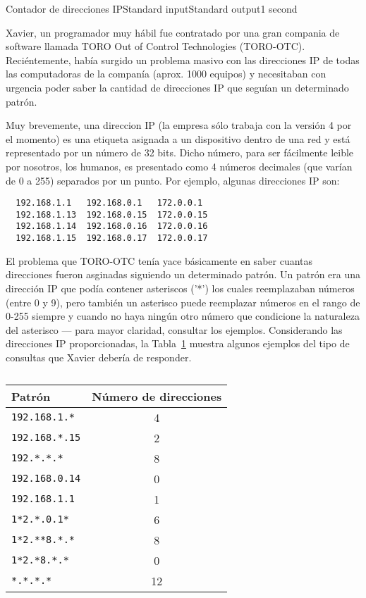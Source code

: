 \begin{problem}{Contador de direcciones IP}{Standard input}{Standard output}{1 second}{}


Xavier, un programador muy h\'abil fue contratado por una gran compania de software llamada TORO Out of Control Technologies (TORO-OTC). Reci\'entemente, hab\'ia surgido un problema masivo con las direcciones IP de todas las computadoras de la compan\'ia (aprox. 1000 equipos) y necesitaban con urgencia poder saber la cantidad de direcciones IP que segu\'ian un determinado patr\'on.

Muy brevemente, una direccion IP (la empresa s\'olo trabaja con la versi\'on 4 por el momento)  es una etiqueta asignada a un dispositivo dentro de una red y est\'a representado por un n\'umero de 32 bits. Dicho n\'umero, para ser f\'acilmente leible por nosotros, los humanos, es presentado como 4 n\'umeros decimales (que var\'ian de 0 a 255) separados por un punto. Por ejemplo, algunas direcciones IP son:

\begin{verbatim}
  192.168.1.1   192.168.0.1   172.0.0.1
  192.168.1.13  192.168.0.15  172.0.0.15
  192.168.1.14  192.168.0.16  172.0.0.16
  192.168.1.15  192.168.0.17  172.0.0.17
\end{verbatim}

El problema que TORO-OTC ten\'ia yace b\'asicamente en saber cuantas direcciones fueron asginadas siguiendo un determinado patr\'on. Un patr\'on era una direcci\'on IP que pod\'ia contener asteriscos ('*') los cuales reemplazaban n\'umeros (entre 0 y 9), pero tambi\'en un asterisco puede reemplazar n\'umeros en el rango de 0-255 siempre y cuando no haya ning\'un otro n\'umero que condicione la naturaleza del asterisco --- para mayor claridad, consultar los ejemplos. Considerando las direcciones IP proporcionadas, la Tabla~\ref{tab:ip} muestra algunos ejemplos del tipo de consultas que Xavier deber\'ia de responder.

\begin{table}[h]
\centering
\caption{}
\label{tab:ip}
\begin{tabular}{|l|c|}
\hline
Patrón        & Número de direcciones \\
\hline
\texttt{192.168.1.* }  & 4 \\
\texttt{192.168.*.15}  & 2 \\
\texttt{192.*.*.*   }  & 8 \\
\texttt{192.168.0.14}  & 0 \\
\texttt{192.168.1.1 }  & 1 \\
\texttt{1*2.*.0.1* }   & 6 \\
\texttt{1*2.**8.*.*}   & 8 \\
\texttt{1*2.*8.*.*}    & 0 \\
\texttt{*.*.*.*}       & 12 \\ 
\hline
\end{tabular}
\end{table}



\end{problem}
